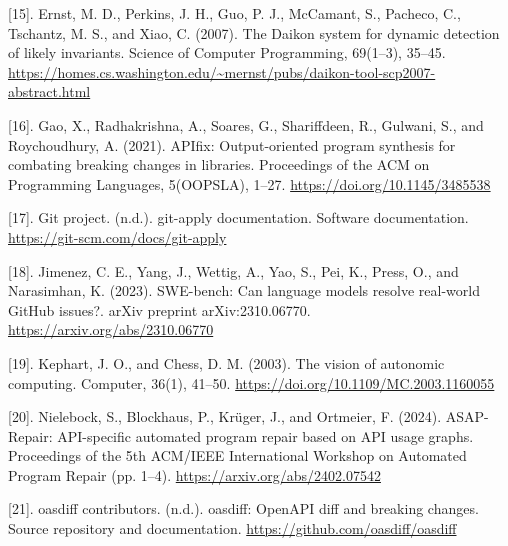 \documentclass[12pt,a4paper,oneside]{report}
\begin{document}
\begingroup\setlength{\hangindent}{0pt} [15]. Ernst, M. D., Perkins, J. H., Guo, P. J., McCamant, S., Pacheco, C., Tschantz, M. S., and Xiao, C. (2007). The Daikon system for dynamic detection of likely invariants. Science of Computer Programming, 69(1–3), 35–45. \url{https://homes.cs.washington.edu/~mernst/pubs/daikon-tool-scp2007-abstract.html}\par\endgroup\vspace{6pt}
\begingroup\setlength{\hangindent}{0pt} [16]. Gao, X., Radhakrishna, A., Soares, G., Shariffdeen, R., Gulwani, S., and Roychoudhury, A. (2021). APIfix: Output-oriented program synthesis for combating breaking changes in libraries. Proceedings of the ACM on Programming Languages, 5(OOPSLA), 1–27. \url{https://doi.org/10.1145/3485538}\par\endgroup\vspace{6pt}
\begingroup\setlength{\hangindent}{0pt} [17]. Git project. (n.d.). git-apply documentation. Software documentation. \url{https://git-scm.com/docs/git-apply}\par\endgroup\vspace{6pt}
\begingroup\setlength{\hangindent}{0pt} [18]. Jimenez, C. E., Yang, J., Wettig, A., Yao, S., Pei, K., Press, O., and Narasimhan, K. (2023). SWE-bench: Can language models resolve real-world GitHub issues?. arXiv preprint arXiv:2310.06770. \url{https://arxiv.org/abs/2310.06770}\par\endgroup\vspace{6pt}
\begingroup\setlength{\hangindent}{0pt} [19]. Kephart, J. O., and Chess, D. M. (2003). The vision of autonomic computing. Computer, 36(1), 41–50. \url{https://doi.org/10.1109/MC.2003.1160055}\par\endgroup\vspace{6pt}
\begingroup\setlength{\hangindent}{0pt} [20]. Nielebock, S., Blockhaus, P., Krüger, J., and Ortmeier, F. (2024). ASAP-Repair: API-specific automated program repair based on API usage graphs. Proceedings of the 5th ACM/IEEE International Workshop on Automated Program Repair (pp. 1–4). \url{https://arxiv.org/abs/2402.07542}\par\endgroup\vspace{6pt}
\begingroup\setlength{\hangindent}{0pt} [21]. oasdiff contributors. (n.d.). oasdiff: OpenAPI diff and breaking changes. Source repository and documentation. \url{https://github.com/oasdiff/oasdiff}\par\endgroup\vspace{6pt}
\end{document}
